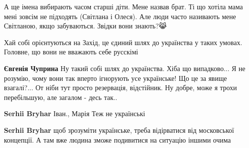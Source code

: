 \begin{itemize}
 

А ще імена вибирають часом старші діти. Мене назвав брат. Ті що хотіла мама
мені зовсім не підходять (Світлана і Олеся). Але люди часто називають мене
Світланою, якщо забуваються. Звідки вони знають?😹

 

Хай собі орієнтуються на Захід, це єдиний шлях до українства у таких умовах.
Головне, що вони не вважають себе русскімі

\begin{itemize}
 
\textbf{Євгенія Чуприна} Ну такий собі шлях до українства. Хіба що випадково... Я не розумію, чому вони так вперто ігнорують усе українське! Що це за явище взагалі?... От ніби тут просто резервація, відстійник. Ну добре, може я трохи перебільшую, але загалом - десь так..

 
\textbf{Serhii Bryhar}
Іван.,
Марія
Теж не українські

 
\textbf{Serhii Bryhar} щоб зрозуміти українське, треба відірватися від московської концепції. А там вже людина зможе подивитися на ситуацію іншими очима
\end{itemize}


\end{itemize}
